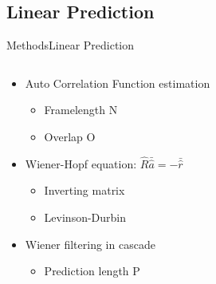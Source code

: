 \subsection{Linear Prediction}
\begin{frame}{Methods}{Linear Prediction}		
		\begin{columns}
			\begin{column}{0.5\textwidth}
			\begin{itemize}
				\item Auto Correlation Function estimation 
				\begin{itemize}
					\item Framelength N
					\item Overlap O
				\end{itemize}
				\item Wiener-Hopf equation: $\hat{R}  \bar{\hat{a}} = -\bar{\hat{r}}$
				\begin{itemize}
					\item Inverting matrix
					\item Levinson-Durbin
				\end{itemize}
				\item Wiener filtering in cascade
				\begin{itemize}
					\item Prediction length P
				\end{itemize}
			\end{itemize}
			\end{column}
			\begin{column}{0.5\textwidth} 
			\resizebox{1.0\columnwidth}{!}{		
			}
			\end{column}
		\end{columns}
\end{frame}


